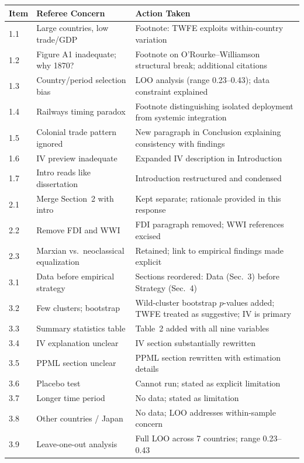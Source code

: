 \documentclass[11pt]{article}
\begin{document}
\begin{longtable}{@{}p{}p{}p{}@{}}
\toprule
\textbf{Item} & \textbf{Referee Concern} & \textbf{Action Taken} \\
\midrule
\endhead
1.1 & Large countries, low trade/GDP & Footnote: TWFE exploits within-country variation \\
1.2 & Figure A1 inadequate; why 1870? & Footnote on O'Rourke--Williamson structural break; additional citations \\
1.3 & Country/period selection bias & LOO analysis (range 0.23--0.43); data constraint explained \\
1.4 & Railways timing paradox & Footnote distinguishing isolated deployment from systemic integration \\
1.5 & Colonial trade pattern ignored & New paragraph in Conclusion explaining consistency with findings \\
1.6 & IV preview inadequate & Expanded IV description in Introduction \\
1.7 & Intro reads like dissertation & Introduction restructured and condensed \\
2.1 & Merge Section~2 with intro & Kept separate; rationale provided in this response \\
2.2 & Remove FDI and WWI & FDI paragraph removed; WWI references excised \\
2.3 & Marxian vs.\ neoclassical equalization & Retained; link to empirical findings made explicit \\
3.1 & Data before empirical strategy & Sections reordered: Data (Sec.~3) before Strategy (Sec.~4) \\
3.2 & Few clusters; bootstrap & Wild-cluster bootstrap $p$-values added; TWFE treated as suggestive; IV is primary \\
3.3 & Summary statistics table & Table~2 added with all nine variables \\
3.4 & IV explanation unclear & IV section substantially rewritten \\
3.5 & PPML section unclear & PPML section rewritten with estimation details \\
3.6 & Placebo test & Cannot run; stated as explicit limitation \\
3.7 & Longer time period & No data; stated as limitation \\
3.8 & Other countries / Japan & No data; LOO addresses within-sample concern \\
3.9 & Leave-one-out analysis & Full LOO across 7 countries; range 0.23--0.43 \\

\end{longtable}
\end{document}
